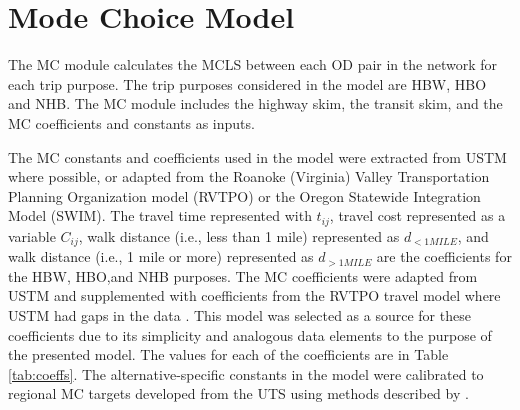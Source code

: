\section{Mode Choice Model}

The MC module calculates the MCLS between each OD pair in the
network for each trip purpose. The trip purposes considered in the model are HBW, HBO and NHB. The MC module includes the highway skim,
the transit skim, and the MC coefficients and constants as inputs.

The MC constants and coefficients used in the model were extracted
from USTM where possible, or adapted from the Roanoke (Virginia)
Valley Transportation Planning Organization model (RVTPO) or the Oregon Statewide Integration Model (SWIM). The travel time represented with $t_{ij}$, travel cost
represented as a variable $C_{ij}$, walk distance (i.e., less than 1 mile) represented
as $d_{<1MILE}$, and walk distance (i.e., 1 mile or more) represented as $d_{>1MILE}$
are the coefficients for the
HBW, HBO,and NHB purposes. The MC coefficients were adapted
from USTM and supplemented with coefficients from the RVTPO travel model where USTM had gaps in the data \citep{rvtpoversion, swimversion}. This model was
selected as a source for these coefficients due to its simplicity and analogous data elements to the purpose of the presented model. The
values for each of the coefficients are in Table \ref{tab:coeffs}. The alternative-specific constants in the model were calibrated to regional MC
targets developed from the UTS using
methods described by \citet{koppelman2006}.

